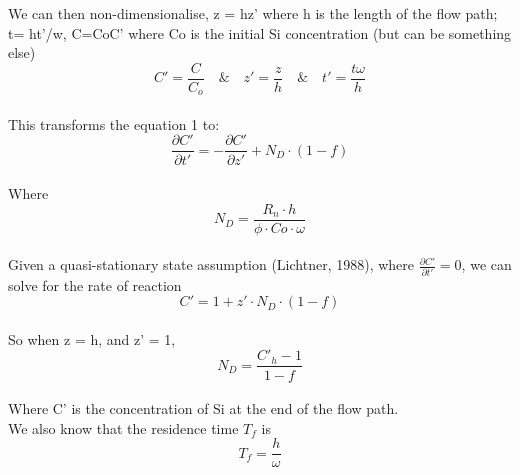 We can then non-dimensionalise, z = hz' where h is the length of the flow path; t= ht'/w, C=CoC' where Co is the initial Si concentration (but can be something else)\\

\begin{equation}
     C' = \frac{C}{C_o} \quad \text{\&} \quad z' = \frac{z}{h} \quad \text{\&} \quad t' = \frac{t\omega}{h}
\end{equation}\\

This transforms the equation 1 to: \\

\begin{equation}
    \frac{\partial C'}{\partial t'} = -\frac{\partial C'}{\partial z'} + N_D\cdot\left(1-f\right)
\end{equation}\\
    

Where \\

\begin{equation}
    N_D = \frac{R_n\cdot h}{\phi\cdot Co \cdot \omega}
\end{equation}\\

Given a quasi-stationary state assumption (Lichtner, 1988), where $\frac{\partial C'}{\partial t'} = 0$, we can solve for the rate of reaction\\

\begin{equation}
    C' = 1 + z' \cdot N_D\cdot\left(1-f\right)
\end{equation} \\

So when z = h, and z' = 1, \\

\begin{equation}
    N_D = \frac{C'_h - 1}{1-f}
\end{equation}\\

Where C' is the concentration of Si at the end of the flow path.\\

We also know that the residence time \( T_f \) is\\

\begin{equation}
T_f = \frac{h}{\omega}
\end{equation}\\


